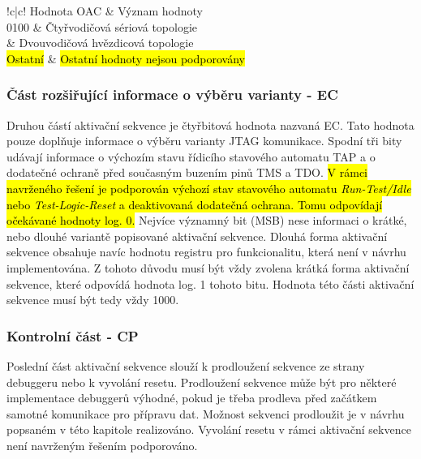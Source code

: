 \begin{table}[!h]
  \caption{Tabulka významu OAC hodnot. \cite{IEEE_1149-7}}
  \begin{center}
  	\small
	  \begin{tabular}{!{\vrule width 1.2pt}c|c!{\vrule width 1.2pt}}
	    Hodnota \acs{OAC} & Význam hodnoty\\
			0100 & Čtyřvodičová sériová topologie\\
			 & Dvouvodičová hvězdicová topologie\\
			\hline
			\hl{Ostatní} & \hl{Ostatní hodnoty nejsou podporovány}\\
			\hline
		\end{tabular}
  \end{center}
	\label{tab:oac}
\end{table}

\subsubsection{Část rozšiřující informace o výběru varianty - \acs{EC}}
Druhou částí aktivační sekvence je čtyřbitová hodnota nazvaná \acl{EC}. Tato hodnota pouze doplňuje informace o výběru varianty \acs{JTAG} komunikace. Spodní tři bity udávají informace o výchozím stavu řídicího stavového automatu \acs{TAP} a o dodatečné ochraně před současným buzením pinů \acs{TMS} a \acs{TDO}. \hl{V rámci navrženého řešení je podporován výchozí stav stavového automatu \textit{Run-Test/Idle} nebo \textit{Test-Logic-Reset} a deaktivovaná dodatečná ochrana. Tomu odpovídají očekávané hodnoty log. 0.} Nejvíce významný bit (\acs{MSB}) nese informaci o krátké, nebo dlouhé variantě popisované aktivační sekvence. Dlouhá forma aktivační sekvence obsahuje navíc hodnotu registru pro funkcionalitu, která není v návrhu implementována. Z tohoto důvodu musí být vždy zvolena krátká forma aktivační sekvence, které odpovídá hodnota log. 1 tohoto bitu. Hodnota této části aktivační sekvence musí být tedy vždy 1000. \cite{IEEE_1149-7}

\subsubsection{Kontrolní část - \acs{CP}}
Poslední část aktivační sekvence slouží k prodloužení sekvence ze strany debuggeru nebo k vyvolání resetu. Prodloužení sekvence může být pro některé implementace debuggerů výhodné, pokud je třeba prodleva před začátkem samotné komunikace pro přípravu dat. Možnost sekvenci prodloužit je v návrhu popsaném v této kapitole realizováno. Vyvolání resetu v rámci aktivační sekvence není navrženým řešením podporováno. \cite{IEEE_1149-7}

